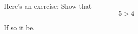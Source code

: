 \documentclass[topology, algebra]{bsteffan-exsheet}
\author{Ben Steffan}
\date{\today}
\begin{document}
\maketitle
\begin{exercise}
	Here's an exercise:
	Show that 
	\begin{equation*}
		5 > 4
	\end{equation*}
\end{exercise}
\begin{solution}
	If so it be.
\end{solution}
\end{document}
